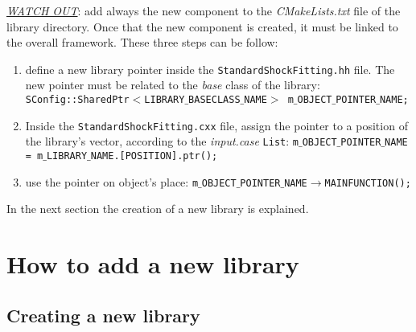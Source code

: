 \documentclass[11pt,a4paper,oneside]{article}
\begin{document}
\underline{\emph{WATCH OUT}}: add always the new component to the \textit{CMakeLists.txt} file of the library directory.
\newline
Once that the new component is created, it must be linked to the overall framework. These three steps can be follow:

\begin{enumerate}
\item{define a new library pointer inside the \texttt{StandardShockFitting.hh} file. The new pointer must be related to the \textit{base} class of the library:
\newline
\newline
\hspace*{0.8cm} \texttt{SConfig::SharedPtr$<$LIBRARY$\_$BASECLASS$\_$NAME$>$ m$\_$OBJECT$\_$POINTER$\_$NAME;}
}
\item{Inside the \texttt{StandardShockFitting.cxx} file, assign the pointer to a position of the library's vector, according to the \textit{input.case} \texttt{List}:
\newline
\newline
\hspace*{0.8cm} \texttt{m$\_$OBJECT$\_$POINTER$\_$NAME = m$\_$LIBRARY$\_$NAME.[POSITION].ptr();}
}
\item{use the pointer on object's place:
\newline
\newline
\hspace*{0.8cm} \texttt{m$\_$OBJECT$\_$POINTER$\_$NAME$\rightarrow$MAINFUNCTION();}
}
\end{enumerate}

In the next section the creation of a new library is explained.

\section{How to add a new library}
\label{sec:add new library}

\subsection{Creating a new library}
\end{document}
